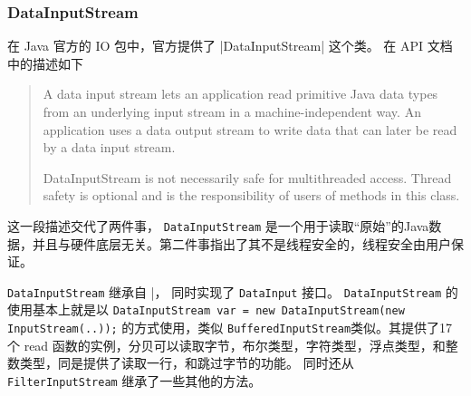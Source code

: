 
\subsubsection{DataInputStream}
\label{sec:uml:input:datainputstream}

在 Java 官方的 IO 包中，官方提供了 \lstline|DataInputStream| 这个类。
在 API 文档中的描述如下
\begin{quote}
  A data input stream lets an application read primitive Java data types from an underlying input stream in a machine-independent way. 
  An application uses a data output stream to write data that can later be read by a data input stream.

  DataInputStream is not necessarily safe for multithreaded access. Thread safety is optional and is the responsibility of users of methods in this class.
\end{quote}

这一段描述交代了两件事， \lstinline|DataInputStream| 是一个用于读取“原始”的Java数据，并且与硬件底层无关。第二件事指出了其不是线程安全的，线程安全由用户保证。

\lstinline|DataInputStream| 继承自 \FilterInputStream|， 同时实现了 \lstinline|DataInput| 接口。
\lstinline|DataInputStream| 的使用基本上就是以 \lstinline|DataInputStream var = new DataInputStream(new InputStream(..));| 的方式使用，类似
\lstinline|BufferedInputStream|类似。其提供了17个 read 函数的实例，分贝可以读取字节，布尔类型，字符类型，浮点类型，和整数类型，同是提供了读取一行，和跳过字节的功能。
同时还从 \lstinline|FilterInputStream| 继承了一些其他的方法。


